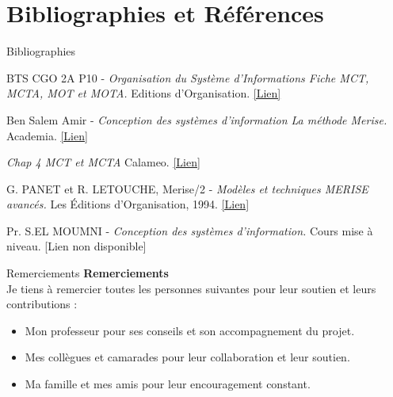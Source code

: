 \documentclass{beamer}
\begin{document}
\section{Bibliographies et Références}
\begin{frame}{Bibliographies}
\begin{thebibliography}{9}

BTS CGO 2A P10 -\textit{ Organisation du Système d’Informations Fiche MCT, MCTA, MOT et MOTA.} Editions d'Organisation. 
\href{https://bit.ly/3D5q0Gw}{[Lien]} 


Ben Salem Amir -\textit{ Conception des systèmes d'information La méthode Merise.} Academia. 
\href{https://www.academia.edu/25575271/Conception_des_systèmes_dinformation_La_méthode_Merise}{[Lien]} 

\textit{ Chap 4 MCT et MCTA
} Calameo. 
\href{https://www.calameo.com/books/001856507ecb0380898f9}{[Lien]} 

G. PANET et R. LETOUCHE, Merise/2 -\textit{ Modèles et techniques MERISE avancés.} Les Éditions d'Organisation, 1994. 
\href{https://www.labri.fr/perso/guibert/DocumentsEnseignement/merise2.pdf}{[Lien]} 

Pr. S.EL MOUMNI -\textit{ Conception des systèmes d’information.} Cours mise à niveau. 
\alert{[Lien non disponible]}

\end{thebibliography}
\end{frame}

\begin{frame}{Remerciements}
    \centering
    \Huge{\textbf{Remerciements}} \\[1cm]
    
    \Large{Je tiens à remercier toutes les personnes suivantes pour leur soutien et leurs contributions :}
    \vspace{0.5cm}
    \begin{itemize}
        \item Mon professeur pour ses conseils et son accompagnement du projet.
        \item Mes collègues et camarades pour leur collaboration et leur soutien.
        \item Ma famille et mes amis pour leur encouragement constant.
    \end{itemize}
    \vspace{1cm}
    
\end{frame}
\end{document}
